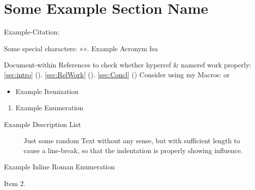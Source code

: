 



\section{Some Example Section Name}

Example-Citation:
\cite{DenKr_denkrement1_indeco}

\npi%
Some special characters:
»«.
\nl%
\nl%
Example Acronym\nl
\gls{fsa}

\npi%
Document-within References to check whether hyperref \& nameref work properly:\nl%
\ref{sec:intro} (). \ref{sec:RelWork}  (). \ref{sec:Concl} ()\nl%
Consider using my Macros:\nl
{} or 

\npi%
\begin{itemize}
\item%
    Example Itemization
\end{itemize}
\begin{enumerate}
\item%
    Example Enumeration
\end{enumerate}
\begin{description}
\item[Example Description List]%
    Just some random Text without any sense, but with sufficient length to cause a line-break, so that the indentation is properly showing influence.
\end{description}
\begin{enuminlrom}
\item%
    Example Inline Roman Enumeration
\item%
    Item 2.
\end{enuminlrom}

\npi%
{%
    \LARGE%
    \contourlength{\DenKrOutlineWidth}%
    \nl%
    {%
        \contourlength{0.2em}%
        \nl%
        \nl%
    }%
    \nl%
}%




